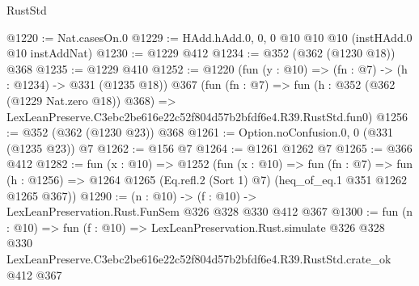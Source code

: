 \begin{lexlean}{RustStd}
\begin{coremodule}
@1220 := Nat.casesOn.{0}
@1229 := HAdd.hAdd.{0, 0, 0} @10 @10 @10 (instHAdd.{0} @10 instAddNat)
@1230 := @1229 @412
@1234 := @352 (@362 (@1230 @18)) @368
@1235 := @1229 @410
@1252 := @1220
    (fun (y : @10) => (fn : @7) -> (h : @1234) -> @331 (@1235 @18))
    @367
    (fun (fn : @7) =>
    fun (h : @352 (@362 (@1229 Nat.zero @18)) @368) =>
    LexLeanPreserve.C3ebc2be616e22c52f804d57b2bfdf6e4.R39.RustStd.fun0)
@1256 := @352 (@362 (@1230 @23)) @368
@1261 := Option.noConfusion.{0, 0} (@331 (@1235 @23)) @7
@1262 := @156 @7
@1264 := @1261 @1262 @7
@1265 := @366 @412
@1282 := fun (x : @10) =>
  @1252
    (fun (x : @10) =>
    fun (fn : @7) =>
    fun (h : @1256) => @1264 @1265 (Eq.refl.{2} (Sort 1) @7) (heq_of_eq.{1} @351 @1262 @1265 @367))
@1290 := (n : @10) -> (f : @10) -> LexLeanPreservation.Rust.FunSem @326 @328 @330 @412 @367
@1300 := fun (n : @10) =>
  fun (f : @10) =>
  LexLeanPreservation.Rust.simulate
    @326
    @328
    @330
    LexLeanPreserve.C3ebc2be616e22c52f804d57b2bfdf6e4.R39.RustStd.crate_ok
    @412
    @367
\end{coremodule}
\end{lexlean}
